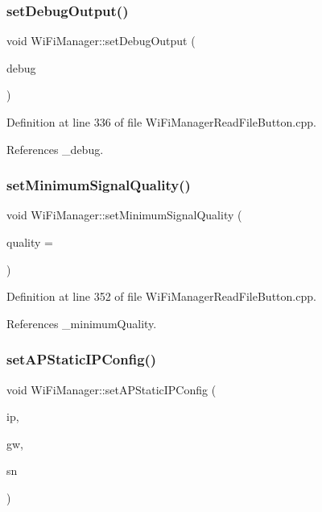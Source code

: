 \subsubsection{\texorpdfstring{set\+Debug\+Output()}{setDebugOutput()}}
{\footnotesize\ttfamily void Wi\+Fi\+Manager\+::set\+Debug\+Output (\begin{DoxyParamCaption}\item[{boolean}]{debug }\end{DoxyParamCaption})}



Definition at line 336 of file Wi\+Fi\+Manager\+Read\+File\+Button.\+cpp.



References \+\_\+debug.

\mbox{\label{class_wi_fi_manager_a8cc211e7e004a44798d5b422a874f94b}} 
\subsubsection{\texorpdfstring{set\+Minimum\+Signal\+Quality()}{setMinimumSignalQuality()}}
{\footnotesize\ttfamily void Wi\+Fi\+Manager\+::set\+Minimum\+Signal\+Quality (\begin{DoxyParamCaption}\item[{int}]{quality = {} }\end{DoxyParamCaption})}



Definition at line 352 of file Wi\+Fi\+Manager\+Read\+File\+Button.\+cpp.



References \+\_\+minimum\+Quality.

\mbox{\label{class_wi_fi_manager_a70007205081cd9bfe4123b65553adf42}} 
\subsubsection{\texorpdfstring{set\+A\+P\+Static\+I\+P\+Config()}{setAPStaticIPConfig()}}
{\footnotesize\ttfamily void Wi\+Fi\+Manager\+::set\+A\+P\+Static\+I\+P\+Config (\begin{DoxyParamCaption}\item[{I\+P\+Address}]{ip,  }\item[{I\+P\+Address}]{gw,  }\item[{I\+P\+Address}]{sn }\end{DoxyParamCaption})}



